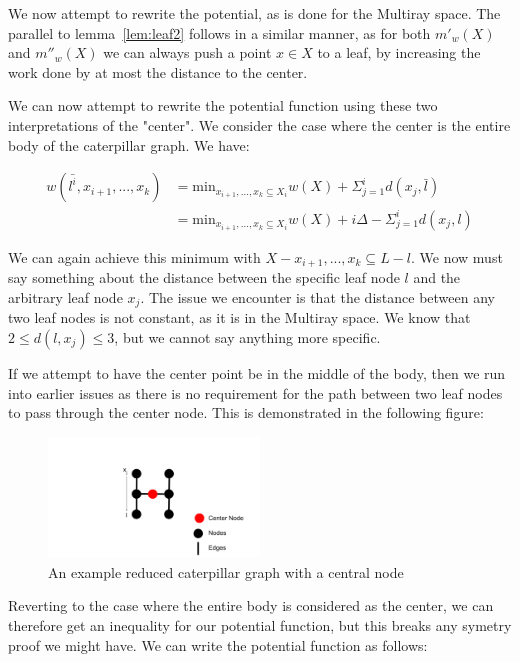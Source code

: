 We now attempt to rewrite the potential, as is done for the Multiray space. The parallel to lemma~\ref{lem:leaf2} follows in a similar manner, as for both $m'_w(X)$ and $m''_w(X)$ we can always push a point $x \in X$ to a leaf, by increasing the work done by at most the distance to the center.

We can now attempt to rewrite the potential function using these two interpretations of the "center". We consider the case where the center is the entire body of the caterpillar graph. We have:

\begin{equation*}
    \begin{split}
    w(\bar{l^i}, x_{i+1}, ..., x_k) &= \mathrm{min}_{x_{i+1}, ..., x_k \subseteq X_i} w(X) + \Sigma_{j=1}^i d(x_j, \bar{l})\\
    &= \mathrm{min}_{x_{i+1}, ..., x_k \subseteq X_i} w(X) + i\Delta - \Sigma_{j=1}^i d(x_j, l)
    \end{split}
\end{equation*}

We can again achieve this minimum with $X-x_{i+1}, ..., x_k\subseteq L-l$. We now must say something about the distance between the specific leaf node $l$ and the arbitrary leaf node $x_j$. The issue we encounter is that the distance between any two leaf nodes is not constant, as it is in the Multiray space. We know that $2 \leq d(l, x_j) \leq 3$, but we cannot say anything more specific. 

If we attempt to have the center point be in the middle of the body, then we run into earlier issues as there is no requirement for the path between two leaf nodes to pass through the center node. This is demonstrated in the following figure:

\begin{figure}[H]
    \centering
    \includegraphics[width=0.5\textwidth]{images/center2.png}
    \caption{An example reduced caterpillar graph with a central node}
\end{figure}

Reverting to the case where the entire body is considered as the center, we can therefore get an inequality for our potential function, but this breaks any symetry proof we might have. We can write the potential function as follows:

